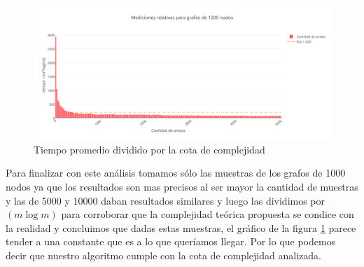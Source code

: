  \begin{figure}[H]
	\centering
 	\includegraphics[scale=0.6]{imagenes/ej3/mlogm1000B.png}
	\caption{Tiempo promedio dividido por la cota de complejidad}
	\label{mlogm}
 \end{figure}

 Para finalizar con este análisis tomamos sólo las muestras de los grafos de 1000 nodos ya que los resultados son mas precisos al ser mayor la cantidad de muestras y  las de 5000 y 10000 daban resultados similares y luego las dividimos por $(m\log{}m)$ para corroborar que la complejidad teórica propuesta se condice con la realidad y concluimos que dadas estas muestras, el gráfico de la figura \ref{mlogm} parece tender a una constante que es a lo que queríamos llegar. Por lo que podemos decir que nuestro algoritmo cumple con la cota de complejidad analizada.